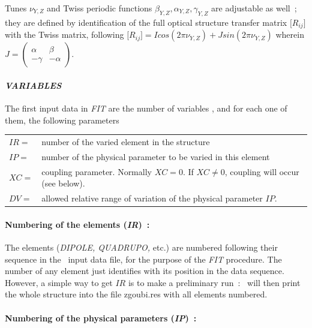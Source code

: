 \noindent Tunes $\nu_{Y,Z}$ and Twiss periodic functions $\beta_{Y,Z}, \alpha_{Y,Z}, \gamma_{Y,Z}$ are adjustable 
as well~; they are defined by identification of the full optical structure transfer matrix  
$  \lbrack R_{ij}\rbrack $  with the Twiss matrix, following 
  $\lbrack R_{ij}\rbrack = I cos(2 \pi \nu_{Y,Z}) + J sin (2 \pi \nu_{Y,Z}) $ wherein 
$J=\left( \begin{array}{cc} \alpha & \beta \\ -\gamma& -\alpha \end{array} \right) $.  

\paragraph{\textit{VARIABLES}}

\noindent The first input data in \textsl{FIT} are the number of variables
\textsl{\NV}, and for each one of them, the following parameters  

\begin{tabular}{ll}
$ IR = $ &number of the varied element in the structure \\
$ IP =  $ &number of the physical parameter to be varied in this element \\
$ XC =  $ &coupling parameter. Normally $ XC=0$.  If $ XC\not= 0$, coupling will occur (see below).\\
$ DV = $ &allowed relative range of variation of the physical parameter $ IP $.
\end{tabular}

\paragraph{Numbering of the elements (\textsl{IR})~: } 

\noindent The elements (\textsl{DIPOLE, QUADRUPO,} etc.) are numbered
following their sequence in the \zgou\ input data file, for the purpose of 
the \textsl{FIT} procedure. The number of any element just identifies with 
its position in the data sequence. However, a simple way to get $ IR $ is to make a preliminary run~: \zgou\ will then
print the whole structure into the file  zgoubi.res with all elements numbered.  

\paragraph{Numbering of the physical parameters (\textsl{IP})~: }

